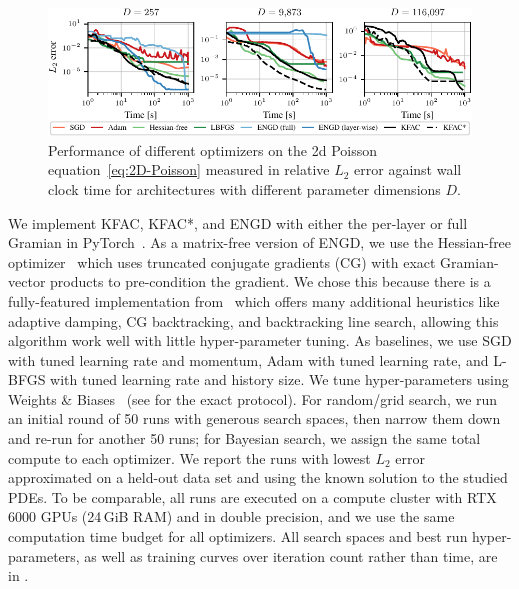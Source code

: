 \begin{figure}[t]
  \centering
  \includegraphics{../kfac_pinns_exp/exp17_groupplot_poisson2d/l2_error_over_time.pdf}
  \caption{Performance of different optimizers on the 2d Poisson equation~\eqref{eq:2D-Poisson} measured in relative $L_2$ error against wall clock time for architectures with different parameter dimensions $D$.}
  \label{fig:2D-Poisson}
\end{figure}

We implement KFAC, KFAC*, and ENGD with either the per-layer or full Gramian in PyTorch~\citep{paszke2019pytorch}.
As a matrix-free version of ENGD, we use the Hessian-free optimizer~\citep{martens2010deep} which uses truncated conjugate gradients (CG) with exact Gramian-vector products to pre-condition the gradient.
We chose this because there is a fully-featured implementation from~\citet{tatzel2022late} which offers many additional heuristics like adaptive damping, CG backtracking, and backtracking line search, allowing this algorithm work well with little hyper-parameter tuning.
As baselines, we use SGD with tuned learning rate and momentum, Adam with tuned learning rate, and L-BFGS with tuned learning rate and history size.
We tune hyper-parameters using Weights \& Biases~\citep{wandb} (see  for the exact protocol).
For random/grid search, we run an initial round of 50 runs with generous search spaces, then narrow them down and re-run for another 50 runs; for Bayesian search, we assign the same total compute to each optimizer.
We report the runs with lowest $L_2$ error approximated on a held-out data set and using the known solution to the studied PDEs.
To be comparable, all runs are executed on a compute cluster with RTX 6000 GPUs (24\,GiB RAM) and in double precision, and we use the same computation time budget for all optimizers.
All search spaces and best run hyper-parameters, as well as training curves over iteration count rather than time, are in .

